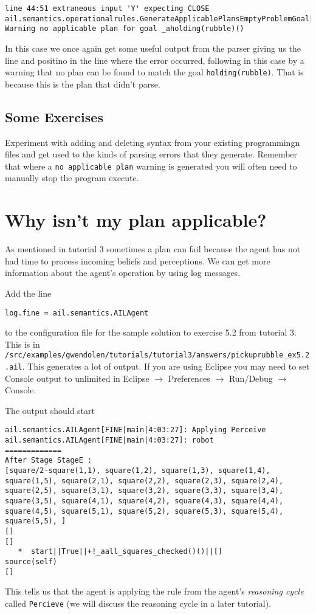 \documentclass[a4]{article}
\begin{document}
\begin{verbatim}
line 44:51 extraneous input 'Y' expecting CLOSE
ail.semantics.operationalrules.GenerateApplicablePlansEmptyProblemGoal[WARNING|main|3:19:44]: 
Warning no applicable plan for goal _aholding(rubble)() 
\end{verbatim}

In this case we once again get some useful output from the parser giving us the line and positino in the line where the error occurred, following in this case by a warning that no plan can be found to match the goal \texttt{holding(rubble)}.  That is because this is the plan that didn't parse.

\subsection{Some Exercises}
Experiment with adding and deleting syntax from your existing programmingn files and get used to the kinds of parsing errors that they generate.  Remember that where a \texttt{no applicable plan} warning is generated you will often need to manually stop the program execute.

\section{Why isn't my plan applicable?}

As mentioned in tutorial 3 sometimes a plan can fail because the agent has not had time to process incoming beliefs and perceptions.  We can get more information about the agent's operation by using log messages.

Add the line
\begin{verbatim}
log.fine = ail.semantics.AILAgent
\end{verbatim}
to the configuration file for the sample solution to exercise 5.2 from tutorial 3.  This is in \texttt{/src/examples/gwendolen/tutorials/tutorial3/answers/pickuprubble\_ex5.2.ail}.  This generates a lot of output.  If you are using Eclipse you may need to set Console output to unlimited in Eclipse $\rightarrow$ Preferences $\rightarrow$ Run/Debug $\rightarrow$ Console.

The output should start
\begin{verbatim}
ail.semantics.AILAgent[FINE|main|4:03:27]: Applying Perceive 
ail.semantics.AILAgent[FINE|main|4:03:27]: robot
=============
After Stage StageE :
[square/2-square(1,1), square(1,2), square(1,3), square(1,4), square(1,5), square(2,1), square(2,2), square(2,3), square(2,4), square(2,5), square(3,1), square(3,2), square(3,3), square(3,4), square(3,5), square(4,1), square(4,2), square(4,3), square(4,4), square(4,5), square(5,1), square(5,2), square(5,3), square(5,4), square(5,5), ]
[]
[]
   *  start||True||+!_aall_squares_checked()()||[]
source(self)
[] 
\end{verbatim}
This tells us that the agent is applying the rule from the agent's \emph{reasoning cycle} called \texttt{Percieve} (we will discuss the reasoning cycle in a later tutorial).
\end{document}
